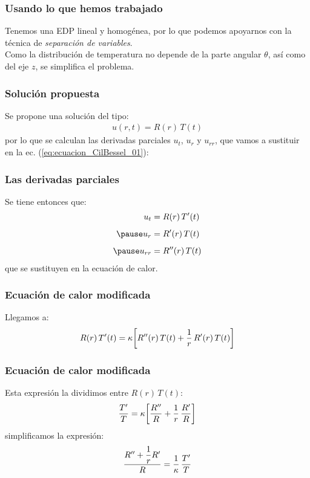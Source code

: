 \documentclass[12pt]{beamer}
\begin{document}
\begin{frame}
\frametitle{Usando lo que hemos trabajado}
Tenemos una EDP lineal y homogénea, por lo que podemos apoyarnos con la técnica de \emph{separación de variables}.
\\
\bigskip
\pause
Como la distribución de temperatura no depende  de la parte angular $\theta$, así como del eje $z$, se simplifica el problema.
\end{frame}
\begin{frame}
\frametitle{Solución propuesta}
Se propone una solución del tipo:
\pause
\begin{align*}
u(r, t) = R(r) \, T(t)
\end{align*}
\pause
por lo que se calculan las derivadas parciales $u_{t}$, $u_{r}$ y $u_{rr}$, que vamos a sustituir en la ec. (\ref{eq:ecuacion_CilBessel_01}):
\end{frame}
\begin{frame}
\frametitle{Las derivadas parciales}
Se tiene entonces que:
\begin{eqnarray*}
\begin{aligned}
u_{t} &= R(r) \, \pderivada{T}(t) \\[0.5em] \pause
u_{r} &= \pderivada{R}(r) \, {T}(t) \\[0.5em] \pause
u_{rr} &= \sderivada{R}(r) \, {T}(t)
\end{aligned}
\end{eqnarray*}
que se sustituyen en la ecuación de calor.
\end{frame}
\begin{frame}
\frametitle{Ecuación de calor modificada}
Llegamos a:
\begin{align*}
R(r) \, {T}^{\prime}(t) = \kappa \bigg[ {R}^{\prime \prime}(r) \, {T}(t) + \dfrac{1}{r} \, {R}^{\prime}(r) \, {T}(t) \bigg]
\end{align*}
\end{frame}
\begin{frame}
\frametitle{Ecuación de calor modificada}
Esta expresión la dividimos entre $R(r) \, T(t)$:
\begin{align*}
\dfrac{{T}^{\prime}}{T} = \kappa \bigg[ \dfrac{{R}^{\prime \prime}}{R} + \dfrac{1}{r} \, \dfrac{{R}^{\prime}}{R} \bigg]
\end{align*}
\pause
simplificamos la expresión:
\begin{align*}
\dfrac{{R}^{\prime \prime} + \dfrac{1}{r} {R}^{\prime}}{R} = \dfrac{1}{\kappa} \, \dfrac{{T}^{\prime}}{T}
\end{align*}
\end{frame}
\end{document}
